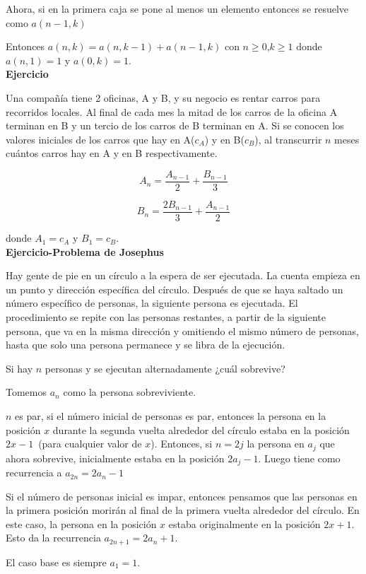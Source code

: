 \documentclass[a4paper,12pt]{report}
\begin{document}
Ahora, si en la primera caja se pone al menos un elemento entonces se resuelve como $a(n-1,k)$

Entonces $a(n,k)=a(n,k-1)+a(n-1,k)$ con $n\geq 0$,$k\geq 1$ donde $a(n,1)=1$ y $a(0,k)=1$.\\

\textbf{Ejercicio}

Una compañía tiene 2 oficinas, A y B, y su negocio es rentar carros para recorridos locales. Al final de cada mes la mitad de los carros de la oficina A terminan en B y un tercio de los carros de B terminan en A. Si se conocen los valores iniciales de los carros que hay en A($c_A$) y en B($c_B$), al transcurrir $n$ meses cuántos carros hay en A y en B respectivamente.

$$A_n=\frac{A_{n-1}}{2}+\frac{B_{n-1}}{3}$$

$$B_n=\frac{2B_{n-1}}{3}+\frac{A_{n-1}}{2}$$

donde $A_1=c_A$ y $B_1=c_B$.\\

\textbf{Ejercicio-Problema de Josephus}

Hay gente de pie en un círculo a la espera de ser ejecutada. La cuenta empieza en un punto y dirección específica del círculo. Después de que se haya saltado un número específico de personas, la siguiente persona es ejecutada. El procedimiento se repite con las personas restantes, a partir de la siguiente persona, que va en la misma dirección y omitiendo el mismo número de personas, hasta que solo una persona permanece y se libra de la ejecución.

Si hay $n$ personas y se ejecutan alternadamente ¿cuál sobrevive?

Tomemos $a_n$ como la persona sobreviviente.

$n$ es par, si el número inicial de personas es par, entonces la persona en la posición $x$ durante la segunda vuelta alrededor del círculo estaba en la posición $2x-1$~(para cualquier valor de $x$). Entonces, si $n=2j$ la persona en $a_j$ que ahora sobrevive, inicialmente estaba en la posición $2a_j-1$. Luego tiene como recurrencia a $a_{2n}=2a_{n}-1$

Si el número de personas inicial es impar, entonces pensamos que las personas en la primera posición morirán al final de la primera vuelta alrededor del círculo. En este caso, la persona en la posición $x$ estaba originalmente en la posición $2x+1$. Esto da la recurrencia $a_{2n+1}=2a_n+1$.

El caso base es siempre $a_1=1$.\\
\end{document}
